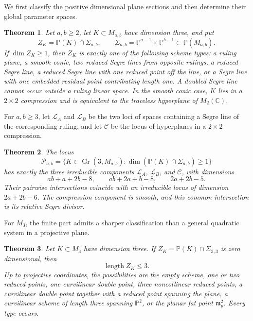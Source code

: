\documentclass[11pt]{amsart}
\newcommand{\chg}[1]{#1}
\newcommand{\Gr}{\operatorname{Gr}}
\theoremstyle{plain}
\newtheorem{theorem}{Theorem}[section]
\theoremstyle{definition}
\theoremstyle{remark}
\begin{document}
\chg{We first classify the positive dimensional plane sections and then determine their global parameter spaces.}

\begin{theorem}\label{thm:main-positive-dimensional}
Let $a,b\ge2$, let $K\subset M_{a,b}$ have dimension three, and put
\[
Z_K=\mathbb P(K)\cap\Sigma_{a,b},\qquad
\Sigma_{a,b}=\mathbb P^{a-1}\times\mathbb P^{b-1}\subset\mathbb P(M_{a,b}).
\]
If $\dim Z_K\ge1$, then $Z_K$ is exactly one of the following scheme types: a ruling plane, a smooth conic, two reduced Segre lines from opposite rulings, a reduced Segre line, a reduced Segre line with one reduced point off the line, or a Segre line with {one embedded residual point contributing length one}. A doubled Segre line cannot occur outside a ruling linear space. In the \chg{smooth conic} case, $K$ lies in a $2\times2$ compression and is equivalent to the traceless hyperplane of $M_2(\mathbb C)$.
\end{theorem}

For $a,b\ge3$, let $\mathcal L_A$ and $\mathcal L_B$ be the two loci of spaces containing a Segre line of the corresponding ruling, and let $\mathcal C$ be the locus of hyperplanes in a $2\times2$ compression.

\begin{theorem}\label{thm:components}
The locus
\[
\mathcal P_{a,b}=\{K\in\Gr(3,M_{a,b}):\dim(\mathbb P(K)\cap\Sigma_{a,b})\ge1\}
\]
has exactly the three irreducible components $\mathcal L_A$, $\mathcal L_B$, and $\mathcal C$, with dimensions
\[
ab+a+2b-8,\qquad ab+2a+b-8,\qquad 2a+2b-5.
\]
Their pairwise intersections coincide with an irreducible locus of dimension $2a+2b-6$. The compression component is smooth, and this common intersection is its relative Segre divisor.
\end{theorem}

\chg{For $M_3$, the finite part admits a sharper classification than a general quadratic system in a projective plane.}

\begin{theorem}\label{thm:finite-main}
Let $K\subset M_3$ have dimension three. If $Z_K=\mathbb P(K)\cap\Sigma_{3,3}$ is \chg{zero dimensional}, then
\[
\operatorname{length}Z_K\le3.
\]
Up to projective coordinates, the possibilities are the empty scheme, one or two reduced points, one curvilinear double point, three noncollinear reduced points, a curvilinear double point together with a reduced point spanning the plane, \chg{a curvilinear scheme of length three spanning $\mathbb P^2$}, or the planar fat point $\mathfrak m_p^2$. Every type occurs.
\end{theorem}
\end{document}
